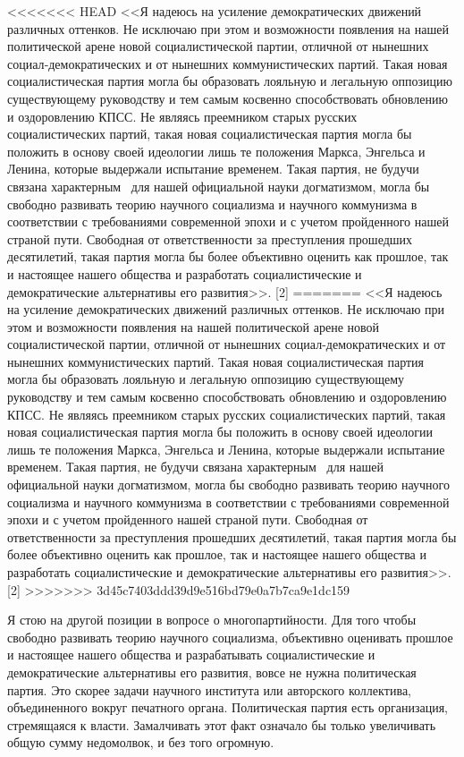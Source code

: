 \documentclass{book}
\begin{document}
<<<<<<< HEAD
<<Я надеюсь на усиление демократических движений различ­ных оттенков. Не исключаю при этом и возможности появле­ния на нашей политической арене новой социалистической пар­тии, отличной от нынешних социал‑демократических и от нынеш­них коммунистических партий. Такая новая социалистическая партия могла бы образовать лояльную и легальную оппозицию существующему руководству и тем самым косвенно способ­ствовать обновлению и оздоровлению КПСС. Не являясь преем­ником старых русских социалистических партий, такая новая социалистическая партия могла бы положить в основу своей идеологии лишь те положения Маркса, Энгельса и Ленина, ко­торые выдержали испытание временем. Такая партия, не бу­дучи связана характерным  для нашей официальной науки догматизмом, могла бы свободно развивать теорию научного социализма и научного коммунизма в соответствии с требова­ниями современной эпохи и с учетом пройденного нашей стра­ной пути. Свободная от ответственности за преступления про­шедших десятилетий, такая партия могла бы более объектив­но оценить как прошлое, так и настоящее нашего общества и разработать социалистические и демократические альтернативы его развития>>. [2]
=======
<<Я надеюсь на усиление демократических движений различ­ных оттенков. Не исключаю при этом и возможности появле­ния на нашей политической арене новой социалистической пар­тии, отличной от нынешних социал-демократических и от нынеш­них коммунистических партий. Такая новая социалистическая партия могла бы образовать лояльную и легальную оппозицию существующему руководству и тем самым косвенно способ­ствовать обновлению и оздоровлению КПСС. Не являясь преем­ником старых русских социалистических партий, такая новая социалистическая партия могла бы положить в основу своей идеологии лишь те положения Маркса, Энгельса и Ленина, ко­торые выдержали испытание временем. Такая партия, не бу­дучи связана характерным  для нашей официальной науки догматизмом, могла бы свободно развивать теорию научного социализма и научного коммунизма в соответствии с требова­ниями современной эпохи и с учетом пройденного нашей стра­ной пути. Свободная от ответственности за преступления про­шедших десятилетий, такая партия могла бы более 
объектив­но оценить как прошлое, так и настоящее нашего общества и разработать социалистические и демократические альтернативы его развития>>. [2]
>>>>>>> 3d45c7403ddd39d9e516bd79e0a7b7ca9e1dc159

Я стою на другой позиции в вопросе о многопартийности. Для того чтобы свободно развивать теорию научного социализ­ма, объективно оценивать прошлое и настоящее нашего общест­ва и разрабатывать социалистические и демократические альтер­нативы его развития, вовсе не нужна политическая партия. Это скорее задачи научного института или авторского коллек­тива, объединенного вокруг печатного органа. Политическая партия есть организация, стремящаяся к власти. Замалчивать этот факт означало бы только увеличивать общую сумму не­домолвок, и без того огромную.
\end{document}
